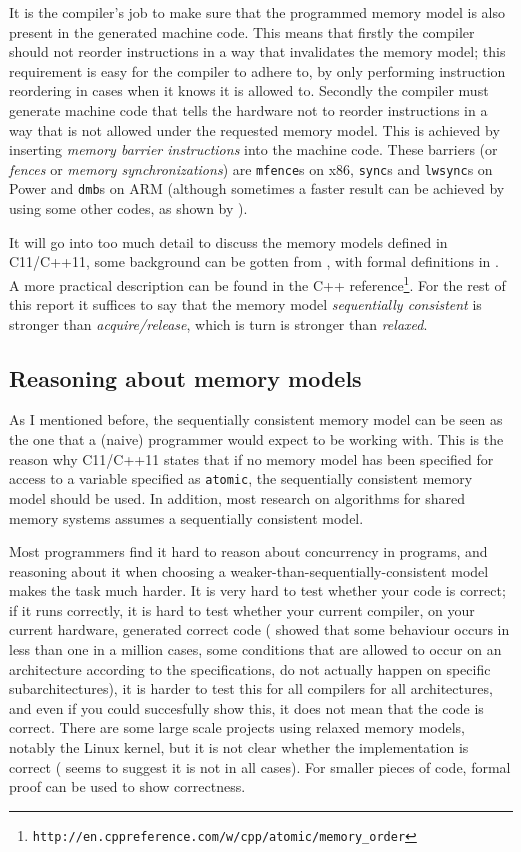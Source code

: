 \documentclass[journal]{IEEEtran}
\begin{document}
It is the compiler's job to make sure that the programmed memory model is also present in the generated machine code.
This means that firstly the compiler should not reorder instructions in a way that invalidates the memory model; this requirement is easy for the compiler to adhere to, by only performing instruction reordering in cases when it knows it is allowed to.
Secondly the compiler must generate machine code that tells the hardware not to reorder instructions in a way that is not allowed under the requested memory model.
This is achieved by inserting \emph{memory barrier instructions} into the machine code.
These barriers (or \emph{fences} or \emph{memory synchronizations}) are \texttt{mfence}s on x86, \texttt{sync}s and \texttt{lwsync}s on Power and \texttt{dmb}s on ARM (although sometimes a faster result can be achieved by using some other codes, as shown by \cite{marangettutorial}).

It will go into too much detail to discuss the memory models defined in C11/C++11, some background can be gotten from \cite{boehm2008foundations}, with formal definitions in \cite{batty2011mathematizing}.
A more practical description can be found in the C++ reference\footnote{\texttt{http://en.cppreference.com/w/cpp/atomic/memory\_order}}.
For the rest of this report it suffices to say that the memory model \emph{sequentially consistent} is stronger than \emph{acquire/release}, which is turn is stronger than \emph{relaxed}.

\subsection{Reasoning about memory models}
As I mentioned before, the sequentially consistent memory model can be seen as the one that a (naive) programmer would expect to be working with.
This is the reason why C11/C++11 states that if no memory model has been specified for access to a variable specified as \texttt{atomic}, the sequentially consistent memory model should be used.
In addition, most research on algorithms for shared memory systems assumes a sequentially consistent model.

Most programmers find it hard to reason about concurrency in programs, and reasoning about it when choosing a weaker-than-sequentially-consistent model makes the task much harder.
It is very hard to test whether your code is correct; if it runs correctly, it is hard to test whether your current compiler, on your current hardware, generated correct code (\cite{marangettutorial} showed that some behaviour occurs in less than one in a million cases, some conditions that are allowed to occur on an architecture according to the specifications, do not actually happen on specific subarchitectures), it is harder to test this for all compilers for all architectures, and even if you could succesfully show this, it does not mean that the code is correct.
There are some large scale projects using relaxed memory models, notably the Linux kernel, but it is not clear whether the implementation is correct (\cite{deacon2013weak} seems to suggest it is not in all cases).
For smaller pieces of code, formal proof can be used to show correctness.
\end{document}
